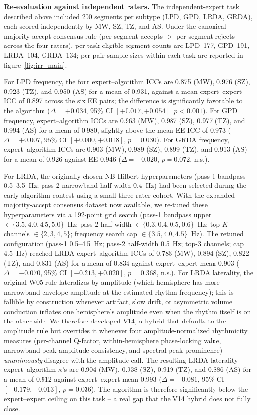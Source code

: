 \documentclass{iopjournal}
\begin{document}
\textbf{Re-evaluation against independent raters.}
\label{sec:reeval}
The independent-expert task described above included 200 segments per subtype (LPD, GPD, LRDA, GRDA), each scored independently by MW, SZ, TZ, and AS. Under the canonical majority-accept consensus rule (per-segment accepts $>$ per-segment rejects across the four raters), per-task eligible segment counts are LPD~177, GPD~191, LRDA~104, GRDA~134; per-pair sample sizes within each task are reported in figure~\ref{fig:irr_main}.

For LPD frequency, the four expert--algorithm ICCs are 0.875 (MW), 0.976 (SZ), 0.923 (TZ), and 0.950 (AS) for a mean of 0.931, against a mean expert--expert ICC of 0.897 across the six EE pairs; the difference is significantly favorable to the algorithm ($\Delta=+0.034$, 95\% CI $[+0.017,+0.054]$, $p<0.001$). For GPD frequency, expert--algorithm ICCs are 0.963 (MW), 0.987 (SZ), 0.977 (TZ), and 0.994 (AS) for a mean of 0.980, slightly above the mean EE ICC of 0.973 ($\Delta=+0.007$, 95\% CI $[+0.000,+0.018]$, $p=0.030$). For GRDA frequency, expert--algorithm ICCs are 0.903 (MW), 0.989 (SZ), 0.899 (TZ), and 0.913 (AS) for a mean of 0.926 against EE 0.946 ($\Delta=-0.020$, $p=0.072$, n.s.).

For LRDA, the originally chosen NB-Hilbert hyperparameters (pass-1 bandpass 0.5--3.5~Hz; pass-2 narrowband half-width 0.4~Hz) had been selected during the early algorithm contest using a small three-rater cohort. With the expanded majority-accept consensus dataset now available, we re-tuned these hyperparameters via a 192-point grid search (pass-1 bandpass upper $\in\{3.5,4.0,4.5,5.0\}$~Hz; pass-2 half-width $\in\{0.3,0.4,0.5,0.6\}$~Hz; top-$K$ channels $\in\{2,3,4,5\}$; frequency search cap $\in\{3.5,4.0,4.5\}$~Hz). The retuned configuration (pass-1 0.5--4.5~Hz; pass-2 half-width 0.5~Hz; top-3 channels; cap 4.5~Hz) reached LRDA expert--algorithm ICCs of 0.788 (MW), 0.894 (SZ), 0.822 (TZ), and 0.831 (AS) for a mean of 0.834 against expert--expert mean 0.903 ($\Delta=-0.070$, 95\% CI $[-0.213,+0.020]$, $p=0.368$, n.s.). For LRDA laterality, the original W05 rule lateralizes by amplitude (which hemisphere has more narrowband envelope amplitude at the estimated rhythm frequency); this is fallible by construction whenever artifact, slow drift, or asymmetric volume conduction inflates one hemisphere's amplitude even when the rhythm itself is on the other side. We therefore developed V14, a hybrid that defaults to the amplitude rule but overrides it whenever four amplitude-normalized rhythmicity measures (per-channel Q-factor, within-hemisphere phase-locking value, narrowband peak-amplitude consistency, and spectral peak prominence) \emph{unanimously} disagree with the amplitude call. The resulting LRDA-laterality expert--algorithm $\kappa$'s are 0.904 (MW), 0.938 (SZ), 0.919 (TZ), and 0.886 (AS) for a mean of 0.912 against expert--expert mean 0.993 ($\Delta=-0.081$, 95\% CI $[-0.179,-0.013]$, $p=0.036$). The algorithm is therefore significantly below the expert--expert ceiling on this task -- a real gap that the V14 hybrid does not fully close.
\end{document}
